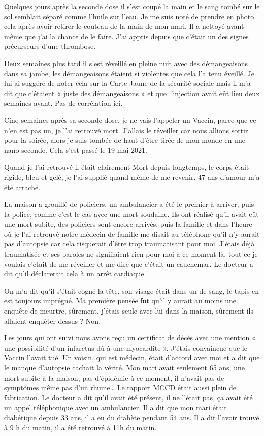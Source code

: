 Quelques jours après la seconde dose il s’est coupé la main et le sang tombé
sur le sol semblait séparé comme l’huile sur l’eau. Je me suis noté de prendre
en photo cela après avoir retirer le couteau de la main de mon mari. Il a
nettoyé avant même que j’ai la chance de le faire. J’ai appris depuis que
c’était un des signes précurseurs d’une thrombose.

Deux semaines plus tard il s’est réveillé en pleine nuit avec des démangeaisons
dans sa jambe, les démangeaisons étaient si violentes que cela l’a tenu
éveillé. Je lui ai suggéré de noter cela sur la Carte Jaune de la sécurité
sociale mais il m’a dit que c’étaient « juste des démangeaisons » et que
l’injection avait eût lieu deux semaines avant. Pas de corrélation ici.

Cinq semaines après sa seconde dose, je ne vais l’appeler un Vaccin, parce que
ce n’en est pas un, je l’ai retrouvé mort. J’allais le réveiller car nous
allions sortir pour la soirée, alors je suis tombée de haut d’être tirée de mon
monde en une nano seconde. Cela s’est passé le 19 mai 2021.

Quand je l’ai retrouvé il était clairement Mort depuis longtemps, le corps
était rigide, bleu et gelé, je l’ai supplié quand même de me revenir. 47 ans
d’amour m’a été arraché.

La maison a grouillé de policiers, un ambulancier a été le premier à arriver,
puis la police, comme c’est le cas avec une mort soudaine. Ils ont réalisé qu’il
avait eût une mort subite, des policiers sont encore arrivés, puis la famille et
dans l’heure où je l’ai retrouvé notre médecin de famille me disait au téléphone
qu’il n’y aurait pas d’autopsie car cela risquerait d’être trop traumatisant
pour moi. J’étais déjà traumatisée et ses paroles ne signifiaient rien pour moi
à ce moment-là, tout ce je voulais c’était de me réveiller et me dire que
c’était un cauchemar. Le docteur a dit qu’il déclarerait cela à un arrêt
cardiaque.

On m’a dit qu’il s’était cogné la tête, son visage était dans un de sang, le
tapis en est toujours imprégné. Ma première pensée fut qu’il y aurait au moins
une enquête de meurtre, sûrement, j’étais seule avec lui dans la maison,
sûrement ils allaient enquêter dessus ? Non.

Les jours qui ont suivi nous avons reçu un certificat de décès avec une mention
« une possibilité d’un infarctus dû à une myocardite ». J’étais convaincue que
le Vaccin l’avait tué. Un voisin, qui est médecin, était d’accord avec moi et a
dit que le manque d’autopsie cachait la vérité. Mon mari avait seulement 65 ans,
une mort subite à la maison, pas d’épidémie à ce moment, il n’avait pas de
symptômes même pas d’un rhume… Le rapport MCCD était aussi plein de
fabrication. Le docteur a dit qu’il avait été présent, il ne l’était pas, ça
avait été un appel téléphonique avec un ambulancier. Il a dit que mon mari était
diabétique depuis 33 ans, il a eu du diabète pendant 54 ans. Il a dit l’avoir
trouvé à 9 h du matin, il a été retrouvé à 11h du matin.

